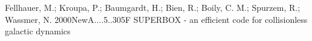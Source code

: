 \begin{figure}[b]
\end{figure}

\begin{figure}[b]
\end{figure}










Fellhauer, M.; Kroupa, P.; Baumgardt, H.; Bien, R.; Boily, C. M.; Spurzem, R.; Wassmer, N.
2000NewA....5..305F
SUPERBOX - an efficient code for collisionless galactic dynamics
